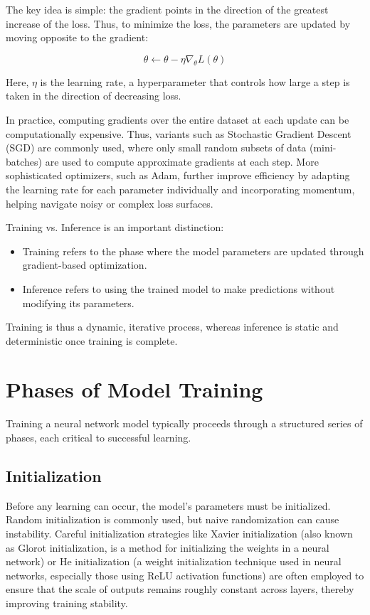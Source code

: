 \documentclass[openany]{book}
\begin{document}
The key idea is simple: the gradient points in the direction of the greatest 
increase of the loss. Thus, to minimize the loss, the parameters are updated by 
moving opposite to the gradient:

\begin{equation}
\theta \leftarrow \theta - \eta \nabla_\theta L(\theta)
\end{equation}

Here, $\eta$ is the learning rate, a hyperparameter that controls how large a 
step is taken in the direction of decreasing loss.

In practice, computing gradients over the entire dataset at each update can be 
computationally expensive. Thus, variants such as Stochastic Gradient Descent 
(SGD) are commonly used, where only small random subsets of data (mini-batches) 
are used to compute approximate gradients at each step. More sophisticated 
optimizers, such as Adam, further improve efficiency by adapting the learning 
rate for each parameter individually and incorporating momentum, helping 
navigate noisy or complex loss surfaces.

Training vs. Inference is an important distinction:

\begin{itemize}
    \item Training refers to the phase where the model parameters are updated 
    through gradient-based optimization.
    \item Inference refers to using the trained model to make predictions 
    without modifying its parameters.
\end{itemize}

Training is thus a dynamic, iterative process, whereas inference is static and 
deterministic once training is complete.

\section{Phases of Model Training}

Training a neural network model typically proceeds through a structured series 
of phases, each critical to successful learning.

\subsection{Initialization}

Before any learning can occur, the model's parameters must be initialized. 
Random initialization is commonly used, but naive randomization can cause 
instability. Careful initialization strategies like Xavier initialization 
(also known as Glorot initialization, is a method for initializing the 
weights in a neural network) or He initialization (a weight initialization 
technique used in neural networks, especially those using ReLU activation 
functions) are often employed to ensure that the scale of outputs remains 
roughly constant across layers, thereby improving training stability.
\end{document}
